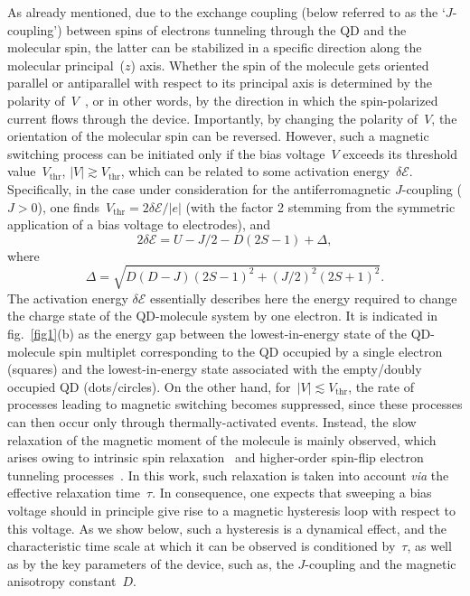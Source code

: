 \documentclass[doublecol]{epl2} %
\newcommand{\En}{\mathcal{E}}
\newcommand{\Vthr}{V_\text{thr}}
\newcommand{\dEn}{\delta\mathcal{E}}
\newcommand{\via}{\emph{via}\xspace}
\begin{document}
As already mentioned, due to the exchange coupling (below referred to as the `$J$-coupling') between spins of electrons tunneling through the QD and the molecular spin, the latter can be stabilized in a specific direction along the molecular principal~($z$) axis. Whether the spin of the molecule gets oriented parallel or antiparallel with respect to its principal axis is determined by the polarity of~$V$~\cite{Misiorny2009Jun}, or in other words, by the direction in which the spin-polarized current flows through the device.
%
Importantly, by changing the polarity of~$V$, the orientation of the molecular spin can be reversed.
%
However, such a magnetic switching process can be initiated only if the bias voltage~$V$ exceeds 
its threshold value~$\Vthr$, \mbox{$|V|\gtrsim\Vthr$}, which can be related to some activation energy~$\dEn$.
%
Specifically, in the case under consideration for the antiferromagnetic $J$-coupling (\mbox{$J>0$}), one finds~\mbox{$\Vthr=2\delta\En/|e|$} (with the factor 2 stemming from the symmetric application of a bias voltage to electrodes), and
%
\begin{equation}
	2\dEn
	=
	U-J/2-D(2S-1)+\Delta
	,
\end{equation}
where
\begin{equation}
	\Delta
	=
	\sqrt{D(D-J)(2S-1)^2+(J/2)^2(2S+1)^2}
	.
\end{equation}
%
The activation energy $\dEn$ essentially describes here the energy required to change the charge state of the QD-molecule system by one electron. It is indicated in fig.~\ref{fig1}(b) as the energy gap between the lowest-in-energy state of the QD-molecule spin multiplet corresponding to the QD occupied by a single electron (squares) and the lowest-in-energy state associated with the empty/doubly occupied QD (dots/circles).
%
On the other hand, for~\mbox{$|V|\lesssim \Vthr$},
the rate of processes leading to magnetic switching becomes suppressed,
since these processes can then occur only through thermally-activated events.
Instead, the slow relaxation of the magnetic moment of the molecule is mainly observed,
which arises owing to intrinsic spin relaxation~\cite{Gatteschi_book}
and higher-order spin-flip electron tunneling processes~\cite{Weymann2006May}.
In this work, such relaxation is taken into account \via the effective relaxation time~$\tau$.
%
In consequence, one expects that sweeping a bias voltage should in principle give
rise to a magnetic hysteresis loop with respect to this voltage.
As we show below, such a hysteresis is a dynamical effect,
and the characteristic time scale at which it can be observed is conditioned by~$\tau$,
as well as by the key parameters of the device, such as,
the $J$-coupling and the magnetic anisotropy constant~$D$.
\end{document}
